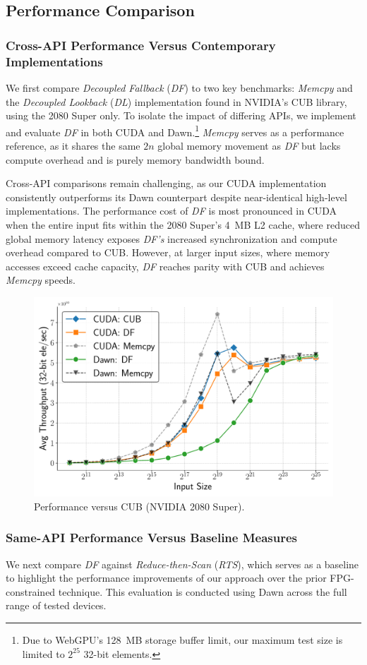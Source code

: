 \documentclass[acmsmall, manuscript, screen, review, anonymous]{acmart}
\begin{document}
\subsection{Performance Comparison}
\subsubsection{Cross-API Performance Versus Contemporary Implementations}
We first compare \emph{Decoupled Fallback} (\emph{DF}) to two key benchmarks: \emph{Memcpy}\textdagger{~\ref{sec:memcpy}} and the \emph{Decoupled Lookback} (\emph{DL}) implementation found in NVIDIA’s CUB library, using the 2080 Super only. To isolate the impact of differing APIs, we implement and evaluate \emph{DF} in both CUDA and Dawn.\footnote{Due to WebGPU’s 128~MB storage buffer limit, our maximum test size is limited to $2^{25}$ 32-bit elements.} \emph{Memcpy} serves as a performance reference, as it shares the same $2n$ global memory movement as \emph{DF} but lacks compute overhead and is purely memory bandwidth bound.

Cross-API comparisons remain challenging, as our CUDA implementation consistently outperforms its Dawn counterpart despite near-identical high-level implementations. The performance cost of \emph{DF} is most pronounced in CUDA when the entire input fits within the 2080 Super’s 4~MB L2 cache, where reduced global memory latency exposes \emph{DF's} increased synchronization and compute overhead compared to CUB\@. However, at larger input sizes, where memory accesses exceed cache capacity, \emph{DF} reaches parity with CUB and achieves \emph{Memcpy} speeds.

\begin{figure}
  \centering
  \includegraphics[width=0.6\linewidth]{graphics/cuda_plot.pdf}
  \caption{Performance versus CUB (NVIDIA 2080 Super).}
\end{figure}

\subsubsection{Same-API Performance Versus Baseline Measures}
We next compare \emph{DF} against \emph{Reduce-then-Scan}\textdagger{~\ref{sec:rts}} (\emph{RTS}), which serves as a baseline to highlight the performance improvements of our approach over the prior FPG-constrained technique. This evaluation is conducted using Dawn across the full range of tested devices.
\end{document}
